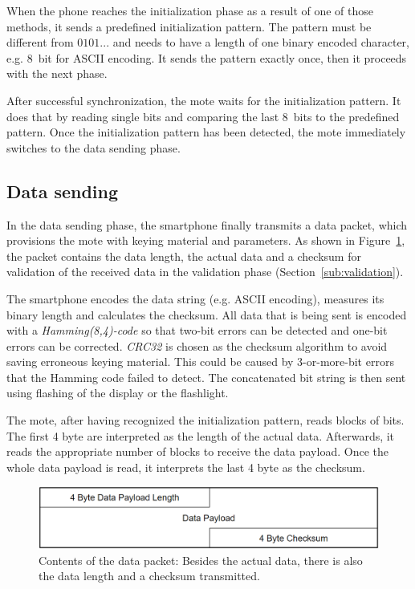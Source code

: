 \documentclass{ewsn-proc} %
\begin{document}
When the phone reaches the initialization phase as a result of one of those methods, it sends a predefined initialization pattern.
The pattern must be different from $0101...$ and needs to have a length of one binary encoded character, e.g. 8~bit for ASCII encoding.
It sends the pattern exactly once, then it proceeds with the next phase.

After successful synchronization, the mote waits for the initialization pattern.
It does that by reading single bits and comparing the last 8~bits to the predefined pattern.
Once the initialization pattern has been detected, the mote immediately switches to the data sending phase.

\subsection{Data sending}
\label{sub:data_sending}

In the data sending phase, the smartphone finally transmits a data packet, which provisions the mote with keying material and parameters.
As shown in Figure~\ref{fig:data_packet}, the packet contains the data length, the actual data and a checksum for validation of the received data in the validation phase (Section~\ref{sub:validation}).

The smartphone encodes the data string (e.g. ASCII encoding), measures its binary length and calculates the checksum.
All data that is being sent is encoded with a \textit{Hamming(8,4)-code} so that two-bit errors can be detected and one-bit errors can be corrected.
\textit{CRC32} is chosen as the checksum algorithm to avoid saving erroneous keying material.
This could be caused by 3-or-more-bit errors that the Hamming code failed to detect.
The concatenated bit string is then sent using flashing of the display or the flashlight.

The mote, after having recognized the initialization pattern, reads blocks of bits.
The first 4 byte are interpreted as the length of the actual data.
Afterwards, it reads the appropriate number of blocks to receive the data payload.
Once the whole data payload is read, it interprets the last 4 byte as the checksum.

\begin{figure}
	\centering
	\includegraphics[scale=.3]{images/data_packet.png}
	\caption{Contents of the data packet: Besides the actual data, there is also the data length and a checksum transmitted.}
	\label{fig:data_packet}
\end{figure}
\end{document}
